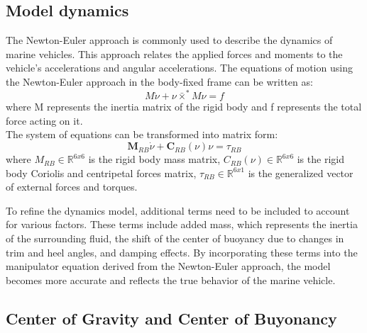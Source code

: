 \subsection{Model dynamics}

    The Newton-Euler approach is commonly used to describe the dynamics of marine vehicles.
    This approach relates the applied forces and moments to the vehicle's accelerations and angular accelerations.
    The equations of motion using the Newton-Euler approach in the body-fixed frame can be written as:
    $$
    M\dot\nu+\nu\bar{\times}^*M\nu=f
    $$
    where M represents the inertia matrix of the rigid body and 
    f represents the total force acting on it.\\
    The system of equations can be transformed into matrix form:
    $$
     \mathbf{M}_{R B} \dot{\nu}+\mathbf{C}_{R B}(\nu) \nu
    =\tau_{R B}
    $$
    where
    $M_{R B} \in \mathbb{R}^{6 x 6}$ is the rigid body mass matrix,
    $C_{R B}(\nu) \in \mathbb{R}^{6 x 6}$ is the rigid body Coriolis and centripetal forces matrix,
    $\tau_{R B} \in \mathbb{R}^{6 x 1}$ is the generalized vector of external forces and torques.
    
    To refine the dynamics model, additional terms need to be included to account for various factors. 
    These terms include added mass, which represents the inertia of the surrounding fluid, 
    the shift of the center of buoyancy due to changes in trim and heel angles, 
    and damping effects. 
    By incorporating these terms into the manipulator equation derived from the Newton-Euler approach, 
    the model becomes more accurate and reflects the true behavior of the marine vehicle.    

\subsection{Center of Gravity and Center of Buyonancy}
    
